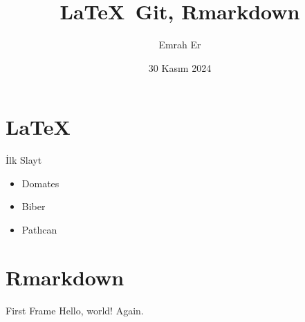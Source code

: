 \documentclass{beamer}
\title{\LaTeX{}\, Git, Rmarkdown}
\date{30 Kasım 2024}
\author{Emrah Er}
\institute{AÜSBF}
\begin{document}
  \maketitle

\section{\LaTeX{}}
  \begin{frame}{İlk Slayt}
    \begin{itemize}
      \item Domates
      \item Biber
      \item Patlıcan
    \end{itemize}
  \end{frame}

\section{Rmarkdown}
  \begin{frame}{First Frame}
    Hello, world! Again.
  \end{frame}
\end{document}
